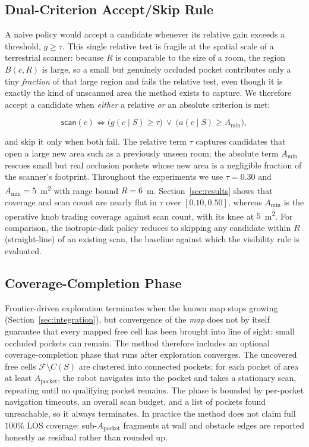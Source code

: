 \documentclass[sensors,article,submit,pdftex,moreauthors]{Definitions/mdpi}
\begin{document}
\subsection{Dual-Criterion Accept/Skip Rule}

A naive policy would accept a candidate whenever its relative gain exceeds a
threshold, $g\ge\tau$. This single relative test is fragile at the spatial scale
of a terrestrial scanner: because $R$ is comparable to the size of a room, the
region $B(c,R)$ is large, so a small but genuinely occluded pocket contributes
only a tiny \emph{fraction} of that large region and fails the relative test,
even though it is exactly the kind of unscanned area the method exists to
capture. We therefore accept a candidate when \emph{either} a relative \emph{or}
an absolute criterion is met:

\begin{equation}
\textsf{scan}(c)\iff
\big(g(c\mid S)\ge\tau\big)\ \lor\ \big(a(c\mid S)\ge A_{\min}\big),
\end{equation}

and skip it only when both fail. The relative term $\tau$ captures candidates
that open a large new area such as a previously unseen room; the absolute term
$A_{\min}$ rescues small but real occlusion pockets whose new area is a
negligible fraction of the scanner's footprint. Throughout the experiments we
use $\tau=0.30$ and $A_{\min}=5$~m\textsuperscript{2} with range bound
$R=6$~m. Section~\ref{sec:results} shows that coverage and scan count are nearly
flat in $\tau$ over $[0.10,0.50]$, whereas $A_{\min}$ is the operative knob
trading coverage against scan count, with its knee at $5$~m\textsuperscript{2}.
For comparison, the isotropic-disk policy reduces to skipping any candidate
within $R$ (straight-line) of an existing scan, the baseline against which the
visibility rule is evaluated.

\subsection{Coverage-Completion Phase}

Frontier-driven exploration terminates when the known map stops growing
(Section~\ref{sec:integration}), but convergence of the \emph{map} does not by
itself guarantee that every mapped free cell has been brought into line of
sight: small occluded pockets can remain. The method therefore includes an
optional coverage-completion phase that runs after exploration converges. The
uncovered free cells $\mathcal{F}\setminus C(S)$ are clustered into connected
pockets; for each pocket of area at least $A_{\mathrm{pocket}}$, the robot
navigates into the pocket and takes a stationary scan, repeating until no
qualifying pocket remains. The phase is bounded by per-pocket navigation
timeouts, an overall scan budget, and a list of pockets found unreachable, so it
always terminates. In practice the method does not claim full $100\%$ LOS
coverage: sub-$A_{\mathrm{pocket}}$ fragments at wall and obstacle edges are
reported honestly as residual rather than rounded up.
\end{document}
